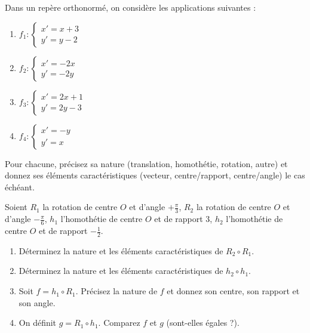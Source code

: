 \documentclass[11pt]{article}
\begin{document}
\begin{exercice}
Dans un repère orthonormé, on considère les applications suivantes :
\begin{enumerate}
    \item $f_1 : \begin{cases} x' = x + 3 \\ y' = y - 2 \end{cases}$
    \item $f_2 : \begin{cases} x' = -2x \\ y' = -2y \end{cases}$
    \item $f_3 : \begin{cases} x' = 2x + 1 \\ y' = 2y - 3 \end{cases}$
    \item $f_4 : \begin{cases} x' = -y \\ y' = x \end{cases}$
\end{enumerate}
Pour chacune, précisez sa nature (translation, homothétie, rotation, autre) et donnez ses éléments caractéristiques (vecteur, centre/rapport, centre/angle) le cas échéant.
\end{exercice}

\begin{exercice}
Soient $R_1$ la rotation de centre $O$ et d'angle $+\frac{\pi}{3}$, $R_2$ la rotation de centre $O$ et d'angle $-\frac{\pi}{6}$, $h_1$ l'homothétie de centre $O$ et de rapport $3$, $h_2$ l'homothétie de centre $O$ et de rapport $-\frac{1}{2}$.
\begin{enumerate}
    \item Déterminez la nature et les éléments caractéristiques de $R_2 \circ R_1$.
    \item Déterminez la nature et les éléments caractéristiques de $h_2 \circ h_1$.
    \item Soit $f = h_1 \circ R_1$. Précisez la nature de $f$ et donnez son centre, son rapport et son angle.
    \item On définit $g = R_1 \circ h_1$. Comparez $f$ et $g$ (sont-elles égales ?).
\end{enumerate}
\end{exercice}
\end{document}
